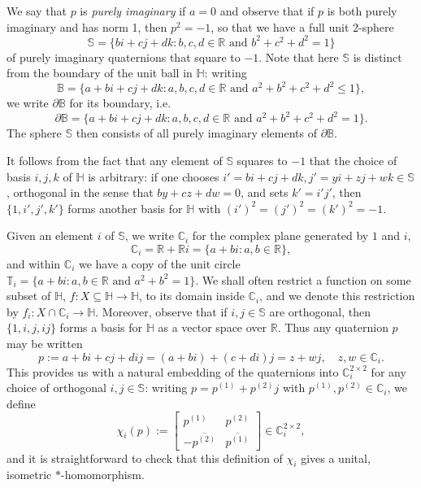 \documentclass[11pt,reqno]{amsart}
\def\x{\chi}
\def\RR{\mathbb{R}}
\def\CC{\mathbb{C}}
\def\BB{\mathbb{B}}
\def\SS{\mathbb{S}}
\def\TT{\mathbb{T}}
\def\HH{\mathbb{H}}
\theoremstyle{definition}
\numberwithin{equation}{section}
\begin{document}
We say that \(p\) is \emph{purely imaginary} if \(a = 0\) and observe that if \(p\) is both purely imaginary and has norm 1, then \(p^2 = -1\), so that we have a full unit 2-sphere
\[
    \SS = \{bi + cj + dk : b,c,d \in \RR \text{ and } b^2 + c^2 + d^2 = 1\}
\]
of purely imaginary quaternions that square to \(-1\). Note that here \(\SS\) is distinct from the boundary of the unit ball in \(\HH\): writing
\[
    \BB = \{a + bi + cj + dk : a,b,c,d \in \RR \text{ and } a^2 + b^2 + c^2 + d^2 \leq 1\},
\]
we write \(\partial\BB\) for its boundary, i.e.
\[
    \partial\BB = \{a + bi + cj + dk : a,b,c,d \in \RR \text{ and } a^2 + b^2 + c^2 + d^2 = 1\}.
\]
The sphere \(\SS\) then consists of all purely imaginary elements of \(\partial\BB\).

It follows from the fact that any element of \(\SS\) squares to \(-1\) that the choice of basis \(i,j,k\) of \(\HH\) is arbitrary: if one chooses \(i' = bi + cj + dk, j' = yi + zj + wk \in \SS\), orthogonal in the sense that \(by + cz + dw = 0\), and sets \(k' =  i'j'\), then \(\{1, i', j', k'\}\) forms another basis for \(\HH\) with \((i')^2 = (j')^2 = (k')^2 = -1\).

Given an element \(i\) of \(\SS\), we write \(\CC_i\) for the complex plane generated by \(1\) and \(i\), 
\[
    \CC_i = \RR + \RR i = \{a + bi : a,b \in \RR\},
\]
and within \(\CC_i\) we have a copy of the unit circle \(\TT_i = \{a + bi : a,b \in \RR \text{ and } a^2 + b^2 = 1\}\). We shall often restrict a function on some subset of \(\HH\), \(f : X \subseteq \HH \to \HH\), to its domain inside \(\CC_i\), and we denote this restriction by \(f_i : X \cap \CC_i \to \HH\). Moreover, observe that if \(i,j \in \SS\) are orthogonal, then \(\{1, i, j, ij\}\) forms a basis for \(\HH\) as a vector space over \(\RR\). Thus any quaternion \(p\) may be written
\[
    p := a + bi + cj + dij = (a + bi) + (c + di)j = z + wj, \quad z, w \in \CC_i.
\]
This provides us with a natural embedding of the quaternions into \(\CC_i^{2\times 2}\) for any choice of orthogonal \(i,j \in \SS\): writing \(p = p^{(1)} + p^{(2)}j\) with \(p^{(1)}, p^{(2)} \in \CC_i\), we define
\[
    \x_i(p) := \begin{bmatrix} p^{(1)} & p^{(2)} \\[6pt] -\overline{p^{(2)}} & \overline{p^{(1)}}\end{bmatrix} \in \CC_i^{2\times 2},
\]
and it is straightforward to check that this definition of \(\x_i\) gives a unital, isometric \(*\)-homomorphism. 
\end{document}
